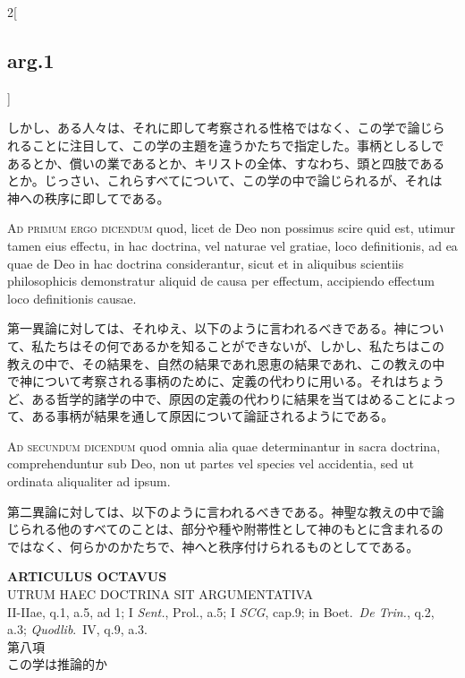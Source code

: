\documentclass[
paper=a4paper,
fontsize=10pt,
jafontsize=9pt,
titlepage
]{jlreq}
\begin{document}
\begin{paracol}{2}[\subsection{arg.1}]
\switchcolumn

しかし、ある人々は、それに即して考察される性格ではなく、この学で論じら
れることに注目して、この学の主題を違うかたちで指定した。事柄としるしで
あるとか、償いの業であるとか、キリストの全体、すなわち、頭と四肢である
とか。じっさい、これらすべてについて、この学の中で論じられるが、それは
神への秩序に即してである。

\switchcolumn*[\subsection{ad.1}]

{\scshape Ad primum ergo dicendum} quod, licet de Deo non possimus
scire quid est, utimur tamen eius effectu, in hac doctrina, vel
naturae vel gratiae, loco definitionis, ad ea quae de Deo in hac
doctrina considerantur, sicut et in aliquibus scientiis philosophicis
demonstratur aliquid de causa per effectum, accipiendo effectum loco
definitionis causae.

\switchcolumn

第一異論に対しては、それゆえ、以下のように言われるべきである。神につい
て、私たちはその何であるかを知ることができないが、しかし、私たちはこの
教えの中で、その結果を、自然の結果であれ恩恵の結果であれ、この教えの中
で神について考察される事柄のために、定義の代わりに用いる。それはちょう
ど、ある哲学的諸学の中で、原因の定義の代わりに結果を当てはめることによっ
て、ある事柄が結果を通して原因について論証されるようにである。

\switchcolumn*[\subsection{ad.2}]

{\scshape Ad secundum dicendum} quod omnia alia quae determinantur in
sacra doctrina, comprehenduntur sub Deo, non ut partes vel species vel
accidentia, sed ut ordinata aliqualiter ad ipsum.

\switchcolumn

第二異論に対しては、以下のように言われるべきである。神聖な教えの中で論
じられる他のすべてのことは、部分や種や附帯性として神のもとに含まれるの
ではなく、何らかのかたちで、神へと秩序付けられるものとしてである。

\end{paracol}
\newpage


{}
\setcounter{section}{8}
\setcounter{subsection}{0}
\begin{center}
 {\Large {\bfseries ARTICULUS OCTAVUS}}\\
 {\large UTRUM HAEC DOCTRINA SIT ARGUMENTATIVA}\\
 {\footnotesize II-IIae, q.1, a.5, ad 1; I {\itshape Sent.}, Prol., a.5;
 I {\itshape SCG}, cap.9; in Boet.~{\itshape De Trin.}, q.2, a.3;
 {\itshape Quodlib}.~IV, q.9, a.3.}\\
 {\Large 第八項\\この学は推論的か}
\end{center}
\end{document}
